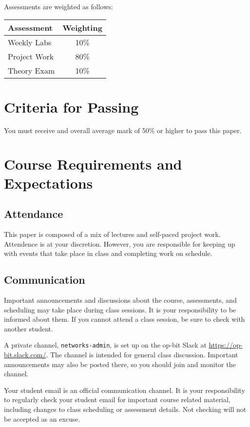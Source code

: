 \documentclass{article}
\begin{document}
Assessments are weighted as follows: \\
\begin{tabular}{|l|c|}
\hline
Assessment                  &  Weighting \\ \hline
Weekly Labs                 &  10\% \\ \hline
Project Work                &  80\% \\ \hline
Theory Exam                 &  10\% \\ \hline
\end{tabular}

\section*{Criteria for Passing}
You must receive and overall average mark of 50\% or higher to pass this paper.

\section*{Course Requirements and Expectations}
\subsection*{Attendance}
This paper is composed of a mix of lectures and self-paced project work.  Attendence is at your discretion. 
However, you are responsible for keeping up with events that take place in class and completing work on schedule. 

\subsection*{Communication}
Important announcements and discussions about the course, assessments, and scheduling may take place during class sessions.  It is your responsibility to be informed about them.  If you cannot attend a class session, be sure to check with another student.

A private channel, \texttt{networks-admin}, is set up on the op-bit Slack at \url{https://op-bit.slack.com/}.  The channel is intended for general class discussion.  Important announcements may also be posted there, so you should join and monitor the channel.

Your student email is an official communication channel. It is your responsibility to regularly check your student email for important course related material, including changes to class scheduling or assessment details. Not checking will not be accepted as an excuse.
\end{document}
